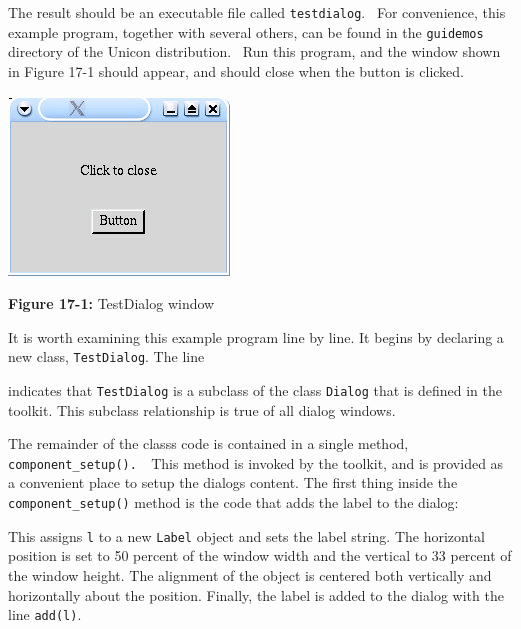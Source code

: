 
The result should be an executable file called \texttt{testdialog}.
\ For convenience, this example program, together with several others,
can be found in the \texttt{guidemos} directory of the Unicon
distribution. \ Run this program, and the window shown in Figure 17-1
should appear, and should close when the button is
clicked.

\begin{center}
\includegraphics[width=2.3126in,height=1.8752in]{ub-img/ub-img50.jpg}
\end{center}

{\sffamily\bfseries Figure 17-1:}
{\sffamily TestDialog window}

\bigskip

It is worth examining this example program line by line. It begins by
declaring a new class, \texttt{TestDialog}. The line


\noindent
indicates that \texttt{TestDialog} is a subclass of the
class \texttt{Dialog} that is defined in the toolkit. This subclass
relationship is true of all dialog windows. 

The remainder of the class{\textquotesingle}s code is contained in a
single method, \texttt{component\_setup(). \ }This method is invoked by
the toolkit, and is provided as a convenient place to setup the
dialog{\textquotesingle}s content. The first thing inside the
\texttt{component\_setup()} method is the code that adds the label to
the dialog: 


\noindent This assigns \texttt{l} to a new \texttt{Label} object
and sets the label string. The horizontal position is set to 50 percent of
the window width and the vertical to 33 percent of the window height.
The alignment of the object is centered both vertically and
horizontally about the position. Finally, the label is added to the
dialog with the line \texttt{add(l)}.

